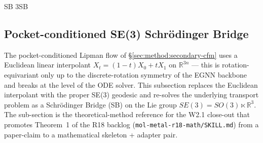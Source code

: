 \makeatletter
\def\WFlipman2023Key{lipman2023flowmatching}
\def\WFholderrieth2024Key{holderrieth2024equivarianthpt}
\def\WFalbergo2023Key{albergo2023stochasticinterpolants}
\def\WFbackhoff2020Key{backhoff_veraguas2020bass_existence}
\let\WForigCiteSE3SB\WForiginalCite
\def\WFcitePlainSE3SB#1{%
  \def\WFciteTempKeySE3SB{#1}%
  \ifx\WFciteTempKeySE3SB\WFlipman2023Key Lipman et al., 2023%
  \else\ifx\WFciteTempKeySE3SB\WFholderrieth2024Key Holderrieth et al., 2024%
  \else\ifx\WFciteTempKeySE3SB\WFalbergo2023Key Albergo \& Vanden-Eijnden, 2023%
  \else\ifx\WFciteTempKeySE3SB\WFbackhoff2020Key Backhoff-Veraguas et al., 2020%
  \else \WForigCiteSE3SB{#1}%
  \fi\fi\fi\fi
}
\let\cite\WFcitePlainSE3SB
\makeatother

\subsection{Pocket-conditioned SE(3) Schr\"odinger Bridge}
\label{sec:method:se3-sb}

The pocket-conditioned Lipman flow of
\S\ref{sec:method:secondary-cfm} uses a Euclidean linear interpolant
$X_t = (1-t) X_0 + t X_1$ on $\mathbb{R}^{3n}$ --- this is rotation-
equivariant only up to the discrete-rotation symmetry of the EGNN
backbone and breaks at the level of the ODE solver.  This subsection
replaces the Euclidean interpolant with the proper SE(3) geodesic and
re-solves the underlying transport problem as a Schr\"odinger Bridge
(SB) on the Lie group $SE(3) = SO(3) \ltimes \mathbb{R}^{3}$.  The
sub-section is the theoretical-method reference for the W2.1 close-out
that promotes Theorem~1 of the R18 backlog
(\texttt{mol-metal-r18-math/SKILL.md}) from a paper-claim to a
mathematical skeleton + adapter pair.

